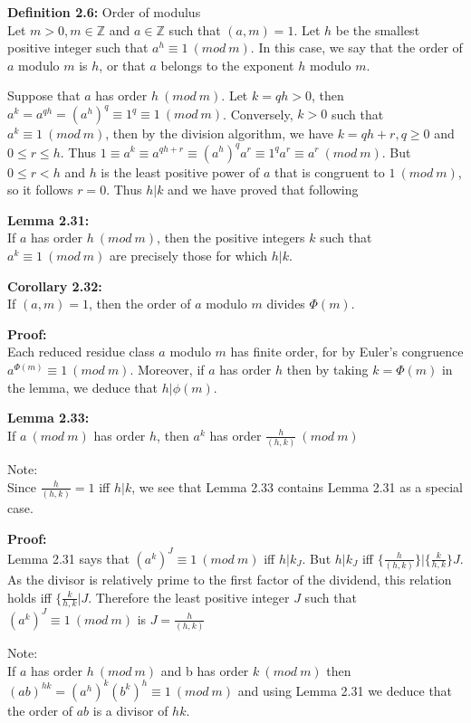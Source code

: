 \documentclass[a4paper]{article}
\begin{document}
\textbf{Definition 2.6:} Order of modulus\\
Let $m>0, m\in\mathbb{Z}$ and $a\in\mathbb{Z}$ such that $(a,m)=1$. Let $h$ be the smallest positive integer such that $a^h\equiv 1\ (mod\ m)$. In this case, we say that the order of $a$ modulo $m$ is $h$, or that $a$ belongs to the exponent $h$ modulo $m$.

Suppose that $a$ has order $h\ (mod\ m)$. Let $k=qh>0$, then $a^k=a^{qh}=(a^h)^q\equiv 1^q\equiv 1\ (mod\ m)$.
Conversely, $k>0$ such that $a^k\equiv 1\ (mod\ m)$, then by the division algorithm, we have $k=qh+r, q\geq0$ and $0\leq r\leq h$. Thus $1\equiv a^k\equiv a^{qh+r}\equiv (a^h)^qa^r\equiv 1^qa^r\equiv a^r\ (mod\ m)$. But $0\leq r<h$ and $h$ is the least positive power of $a$ that is congruent to $1\ (mod\ m)$, so it follows $r=0$. Thus $h|k$ and we have proved that following

\textbf{Lemma 2.31:}\\
If $a$ has order $h\ (mod\ m)$, then the positive integers $k$ such that $a^k\equiv 1\ (mod\ m)$ are precisely those for which $h|k$.

\textbf{Corollary 2.32:}\\
If $(a,m)=1$, then the order of $a$ modulo $m$ divides $\Phi(m)$.

\textbf{Proof:}\\
Each reduced residue class $a$ modulo $m$ has finite order, for by Euler's congruence $a^{\Phi(m)}\equiv 1\ (mod\ m)$. Moreover, if $a$ has order $h$ then by taking $k=\Phi(m)$ in the lemma, we deduce that $h|\phi(m)$.

\textbf{Lemma 2.33:}\\
If $a\ (mod\ m)$ has order $h$, then $a^k$ has order $\frac{h}{(h,k)}\ (mod\ m)$

Note:\\
Since $\frac{h}{(h,k)}=1$ iff $h|k$, we see that Lemma 2.33 contains Lemma 2.31 as a special case.

\textbf{Proof:}\\
Lemma 2.31 says that $(a^k)^J\equiv 1\ (mod\ m)$ iff $h|k_J$. But $h|k_J$ iff $\{\frac{h}{(h,k)}\}|\{\frac{k}{h,k}\}J$. As the divisor is relatively prime to the first factor of the dividend, this relation holds iff $\{\frac{k}{h,k}|J$. Therefore the least positive integer $J$ such that $(a^k)^J\equiv 1\ (mod\ m)$ is $J=\frac{h}{(h,k)}$

Note:\\
If $a$ has order $h\ (mod\ m)$ and b has order $k\ (mod\ m)$ then $(ab)^{hk}=(a^h)^k(b^k)^h\equiv 1\ (mod\ m)$ and using Lemma 2.31 we deduce that the order of $ab$ is a divisor of $hk$.
\end{document}
